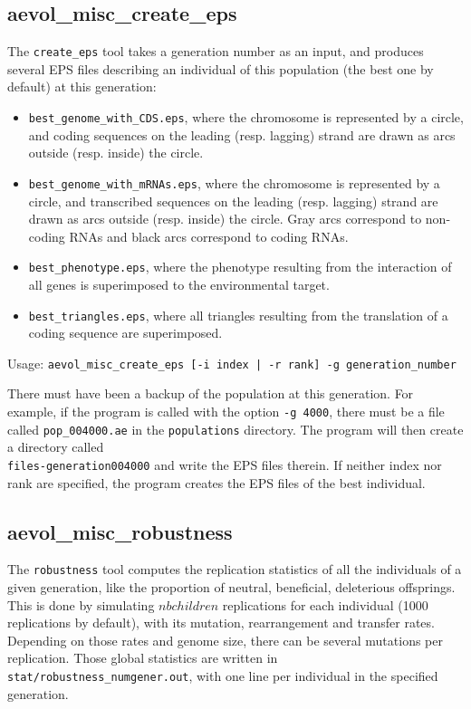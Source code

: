 \subsection{aevol\_misc\_create\_eps}
\label{sect:create-eps}
The \verb?create_eps? tool takes a generation number as an input, and produces several EPS files describing an individual of this population (the best one by default) at this generation:
\begin{itemize}
\item \verb?best_genome_with_CDS.eps?, where the chromosome is represented by a circle, and coding sequences on the leading (resp. lagging) strand are drawn as arcs outside (resp. inside) the circle.
\item \verb?best_genome_with_mRNAs.eps?, where the chromosome is represented by a circle, and transcribed sequences on the leading (resp. lagging) strand are drawn as arcs outside (resp. inside) the circle. Gray arcs correspond to non-coding RNAs and black arcs correspond to coding RNAs.
\item \verb?best_phenotype.eps?, where the phenotype resulting from the interaction of all genes is superimposed to the environmental target.
\item \verb?best_triangles.eps?, where all triangles resulting from the translation of a coding sequence are superimposed.
\end{itemize}

Usage: \verb?aevol_misc_create_eps [-i index | -r rank] -g generation_number?

There must have been a backup of the population at this generation. For example, if the program is called with the option
\verb?-g 4000?, there must be a file called \verb?pop_004000.ae? in the \verb?populations? directory. The program will then create a directory called \\\verb?files-generation004000? and write the EPS files therein. If neither index nor rank are specified, the program creates the EPS files of the best individual.

\subsection{aevol\_misc\_robustness}
\label{sect:robustness}

The \verb?robustness? tool computes the replication statistics of all the individuals of a given generation, like the proportion of neutral, beneficial, deleterious offsprings. This is done by simulating $nbchildren$ replications for each individual (1000 replications by default), with its mutation, rearrangement and transfer rates. Depending on those rates and genome size, there can be several mutations per replication. Those global statistics are written in \verb?stat/robustness_numgener.out?, with one line per individual in the specified generation.

